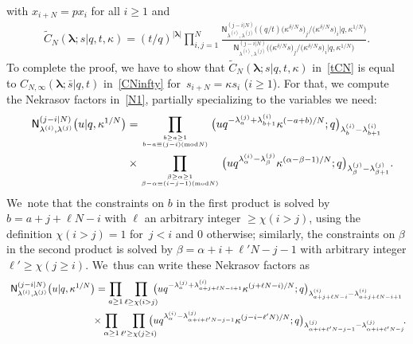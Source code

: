 \documentclass[pdftex]{sigma}%
\numberwithin{equation}{section}
\newcommand{\setatop}[2]{\genfrac{}{}{0pt}{}{#1}{#2}}
\newcommand{\vlam}{\boldsymbol{\lambda}}
\newcommand{\bs}{\bar{s}}
\begin{document}
with $x_{i+N}=px_i$ for all $i\geq 1$ and
\begin{gather}
\label{tCN}
 \tilde C_N(\vlam;s|q,t,\kappa) = (t/q)^{|\vlam|}\prod_{i,j=1}^N\frac{\mathsf{N}^{(j-i|N)}_{\lambda^{(i)},\lambda^{(j)}}\big((q/t)\big(\kappa^{\delta/N} s\big)_j/\big(\kappa^{\delta/N} s\big)_i|q,\kappa^{1/N}\big)}{\mathsf{N}^{(j-i|N)}_{\lambda^{(i)},\lambda^{(j)}}\big(\big(\kappa^{\delta/N} s\big)_j/\big(\kappa^{\delta/N} s\big)_i|q,\kappa^{1/N}\big)} .
\end{gather}
To complete the proof, we have to show that $\tilde C_N(\vlam;s|q,t,\kappa)$ in~\eqref{tCN} is equal to $C_{N,\infty}(\vlam;\bs|q,t)$ in~\eqref{CNinfty} for~$s_{i+N}=\kappa s_i$ ($i\geq 1$).
For that, we compute the Nekrasov factors in~\eqref{N1}, partially specializing to the variables we need:
\begin{gather*}
\mathsf{N}^{(j-i|N)}_{\lambda^{(i)},\lambda^{(j)}}\big(u|q,\kappa^{1/N}\big)=
\prod_{\setatop{b\geq a\geq 1}{b-a\equiv (j-i)(\mathrm{mod}N)}}
\big(u q^{-\lambda^{(j)}_a+\lambda^{(i)}_{b+1}}\kappa^{(-a+b)/N};q\big)_{\lambda^{(i)}_{b}-\lambda^{(i)}_{b+1}}
\\ \hphantom{\mathsf{N}^{(j-i|N)}_{\lambda^{(i)},\lambda^{(j)}}\big(u|q,\kappa^{1/N}\big)= }
{} \times \prod_{\setatop{\beta\geq \alpha\geq 1}{\beta-\alpha\equiv (i-j-1)(\mathrm{mod}N)}}\big(uq^{\lambda^{(i)}_\alpha-\lambda^{(j)}_\beta}
\kappa^{(\alpha-\beta-1)/N};q\big)_{\lambda^{(j)}_\beta-\lambda^{(j)}_{\beta+1}} .
\end{gather*}
We~note that the constraints on $b$ in the first product is solved by $b=a+j+\ell N-i$ with $\ell$ an arbitrary integer $\geq \chi(i>j)$, using the definition $\chi(i>j)=1$ for~$j<i$ and $0$ otherwise; similarly, the constraints on $\beta$ in the second product is solved by $\beta=\alpha+i+\ell' N-j-1$ with arbitrary integer $\ell'\geq \chi(j\geq i)$. We~thus can write these Nekrasov factors as
\begin{gather*}
\mathsf{N}^{(j-i|N)}_{\lambda^{(i)},\lambda^{(j)}}\big(u|q,\kappa^{1/N}\big) = \prod_{a\geq 1}\prod_{\ell\geq \chi(i>j)}\!\!\!\!\big(u q^{-\lambda^{(j)}_a+\lambda^{(i)}_{a+j+\ell N-i+1}}\kappa^{(j+\ell N-i)/N};q\big)_{\lambda^{(i)}_{a+j+\ell N-i}-\lambda^{(i)}_{a+j+\ell N-i+1}}
\\ \hphantom{\mathsf{N}^{(j-i|N)}_{\lambda^{(i)},\lambda^{(j)}}\big(u|q,\kappa^{1/N}\big) }
{}\times
\prod_{\alpha\geq 1}\prod_{\ell'\geq \chi(j\geq i)} \!\!\!\! \!\! \big(uq^{\lambda^{(i)}_\alpha-\lambda^{(j)}_{\alpha+i+\ell' N-j-1}}\kappa^{(j-i-\ell' N)/N};q\big)_{\lambda^{(j)}_{\alpha+i+\ell' N-j-1}-\lambda^{(j)}_{\alpha+i+\ell' N-j}}\! .
\end{gather*}
\end{document}
